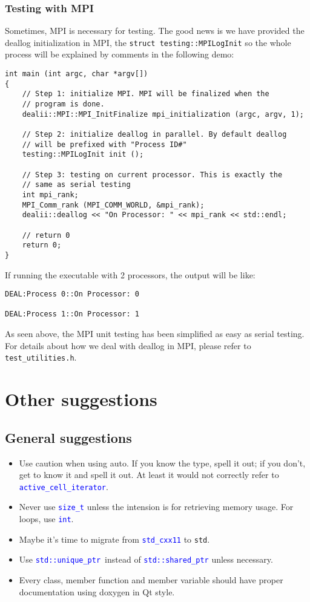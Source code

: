 \documentclass[openany]{book}
\newcommand{\blue}[1]{\textcolor{blue}{#1}}
\begin{document}
\subsection{Testing with MPI}
Sometimes, MPI is necessary for testing. The good news is we have provided the deallog initialization in MPI, the {\tt struct testing::MPILogInit} so the whole process will be explained by comments in the following demo:
\begin{lstlisting}[tabsize=2]
int main (int argc, char *argv[])
{
	// Step 1: initialize MPI. MPI will be finalized when the 
	// program is done.
	dealii::MPI::MPI_InitFinalize mpi_initialization (argc, argv, 1);
	
	// Step 2: initialize deallog in parallel. By default deallog 
	// will be prefixed with "Process ID#"
	testing::MPILogInit init ();
	
	// Step 3: testing on current processor. This is exactly the 
	// same as serial testing
	int mpi_rank;
	MPI_Comm_rank (MPI_COMM_WORLD, &mpi_rank);
	dealii::deallog << "On Processor: " << mpi_rank	<< std::endl;
	
	// return 0
	return 0;
}
\end{lstlisting}

If running the executable with 2 processors, the output will be like:
\begin{verbatim}
DEAL:Process 0::On Processor: 0

DEAL:Process 1::On Processor: 1
\end{verbatim}

As seen above, the MPI unit testing has been simplified as easy as serial testing. For details about how we deal with deallog in MPI, please refer to {\tt test\_utilities.h}.
\chapter{Other suggestions}\label{ch: other-suggestions}
\section{General suggestions}
\begin{itemize}
	\item Use caution when using auto. If you know the type, spell it out; if you don't, get to know it and spell it out. At least it would not correctly refer to {\tt \blue{active\_cell\_iterator}}.
	\item Never use {\tt \blue{size\_t}} unless the intension is for retrieving memory usage. For loops, use {\tt \blue{int}}.
	\item Maybe it's time to migrate from {\tt \blue{std\_cxx11}} to {\tt std}.
	\item Use {\tt \blue{std::unique\_ptr}}\ instead of {\tt \blue{std::shared\_ptr}} unless necessary.
	\item Every class, member function and member variable should have proper documentation using doxygen in Qt style.
\end{itemize}
\end{document}
